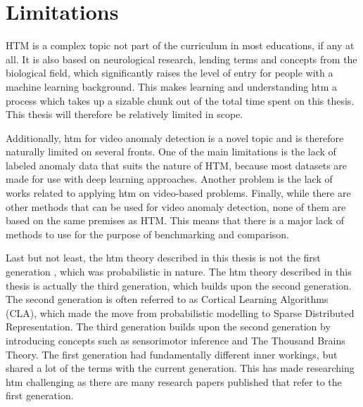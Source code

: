 \section{Limitations}
HTM is a complex topic not part of the curriculum in most educations, if any at all. It is also based on neurological research, lending terms and concepts from the biological field, which significantly raises the level of entry for people with a machine learning background. This makes learning and understanding \gls*{htm} a process which takes up a sizable chunk out of the total time spent on this thesis. This thesis will therefore be relatively limited in scope.
\par
Additionally, \gls*{htm} for video anomaly detection is a novel topic and is therefore naturally limited on several fronts. One of the main limitations is the lack of labeled anomaly data that suits the nature of HTM, because most datasets are made for use with deep learning approaches. Another problem is the lack of works related to applying \gls*{htm} on video-based problems. Finally, while there are other methods that can be used for video anomaly detection, none of them are based on the same premises as HTM. This means that there is a major lack of methods to use for the purpose of benchmarking and comparison.
\par
Last but not least, the \gls*{htm} theory described in this thesis is not the first generation \cite{htm_zeta1}, which was probabilistic in nature. The \gls*{htm} theory described in this thesis is actually the third generation\cite{htm_gen3, thousandbrains}, which builds upon the second generation\cite{htm_gen2_sp,htm_gen2_tm}. The second generation is often referred to as Cortical Learning Algorithms (CLA), which made the move from probabilistic modelling to Sparse Distributed Representation. The third generation builds upon the second generation by introducing concepts such as sensorimotor inference and The Thousand Brains Theory. The first generation had fundamentally different inner workings, but shared a lot of the terms with the current generation. This has made researching  \gls*{htm} challenging as there are many research papers published that refer to the first generation.

